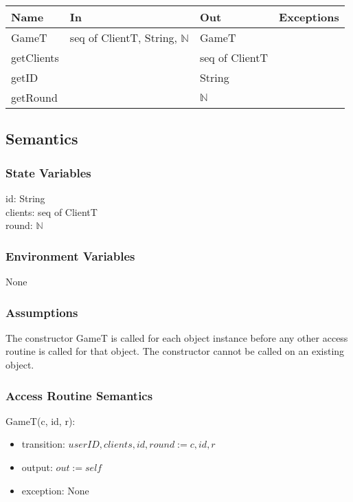 \documentclass[12pt, titlepage]{article}
\begin{document}
\begin{center}
\begin{tabular}{ |  p{4cm} | p{3cm} |  p{3cm} | p{5cm} | }
\hline
\textbf{Name} & \textbf{In} & \textbf{Out} & \textbf{Exceptions} \\
\hline
GameT & seq of ClientT, String, $\mathbb{N}$  &  GameT &  \\
getClients & & seq of ClientT & \\
getID & & String & \\
getRound & & $\mathbb{N}$ & \\

\hline
\end{tabular}
\end{center}

\subsection{Semantics}

\subsubsection{State Variables}

id: String\\
clients: seq of ClientT\\
round:  $\mathbb{N}$\\

\subsubsection{Environment Variables}

None

\subsubsection{Assumptions}
The constructor GameT is called for each object instance before any other access routine is called for that object. The constructor cannot be called on an existing object.

\subsubsection{Access Routine Semantics}

\noindent GameT(c, id, r):
\begin{itemize}
\item transition: $userID, clients, id, round := c, id, r$
\item output: $out := self$
\item exception: None
\end{itemize}
\end{document}
